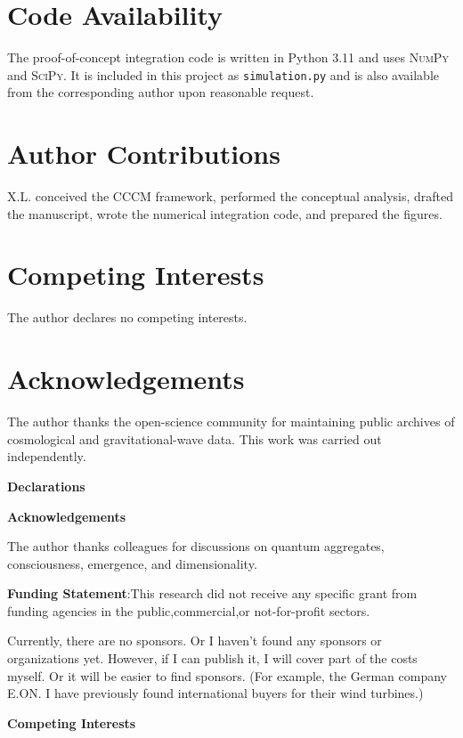 \documentclass[a4paper,11pt]{article}
\newcommand{\CCCM}{CCCM}
\begin{document}
\section*{Code Availability}

The proof-of-concept integration code is written in Python 3.11 and uses \textsc{NumPy} and \textsc{SciPy}. It is included in this project as \texttt{simulation.py} and is also available from the corresponding author upon reasonable request.

\section*{Author Contributions}

X.L. conceived the \CCCM{} framework, performed the conceptual analysis, drafted the manuscript, wrote the numerical integration code, and prepared the figures.

\section*{Competing Interests}

The author declares no competing interests.

\section*{Acknowledgements}

The author thanks the open-science community for maintaining public archives of cosmological and gravitational-wave data. This work was carried out independently.

\printbibliography
\textbf{\textbf{Declarations}}

  \textbf{\textbf{Acknowledgements}}

The author thanks colleagues for discussions on quantum aggregates, consciousness, emergence, and dimensionality. 

 \textbf{\textbf{Funding Statement}}:This research did not receive any specific grant from funding agencies in the public,commercial,or not-for-profit sectors.

Currently, there are no sponsors. Or I haven't found any sponsors or organizations yet. However, if I can publish it, I will cover part of the costs myself. Or it will be easier to find sponsors. (For example, the German company E.ON. I have previously found international buyers for their wind turbines.)

 \textbf{\textbf{Competing Interests}}
\end{document}
